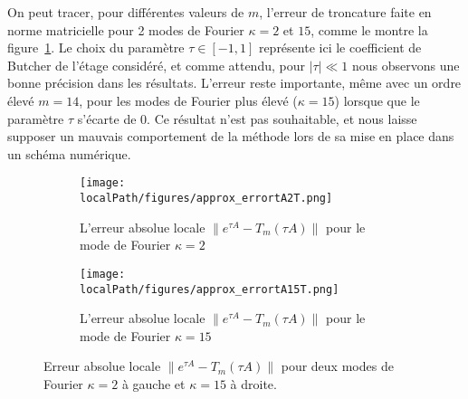 On peut tracer, pour différentes valeurs de $m$, l'erreur de troncature faite en norme matricielle pour 2 modes de Fourier $\kappa=2$ et $15$, comme le montre la figure~\ref{fig:taylor:error}. Le choix du paramètre $\tau\in[-1,1]$ représente ici le coefficient de Butcher de l'étage considéré, et comme attendu, pour $|\tau|\ll1$ nous observons une bonne précision dans les résultats. L'erreur reste importante, même avec un ordre élevé $m=14$, pour les modes de Fourier plus élevé ($\kappa=15$) lorsque que le paramètre $\tau$ s'écarte de $0$. Ce résultat n'est pas souhaitable, et nous laisse supposer un mauvais comportement de la méthode lors de sa mise en place dans un schéma numérique.


\begin{figure}
  \begin{subfigure}{.5\textwidth}
    \centering
    \texttt{[image: \\localPath/figures/approx\_errortA2T.png]}
    \caption{L'erreur absolue locale $\|e^{\tau A}-T_m(\tau A)\|$ pour le mode de Fourier $\kappa=2$}
  \end{subfigure}
  \begin{subfigure}{.5\textwidth}
    \centering
    \texttt{[image: \\localPath/figures/approx\_errortA15T.png]}
    \caption{L'erreur absolue locale $\|e^{\tau A}-T_m(\tau A)\|$ pour le mode de Fourier $\kappa=15$}
  \end{subfigure}
  \caption{Erreur absolue locale $\|e^{\tau A}-T_m(\tau A)\|$ pour deux modes de Fourier $\kappa=2$ à gauche et $\kappa=15$ à droite.}
  \label{fig:taylor:error}
\end{figure}

